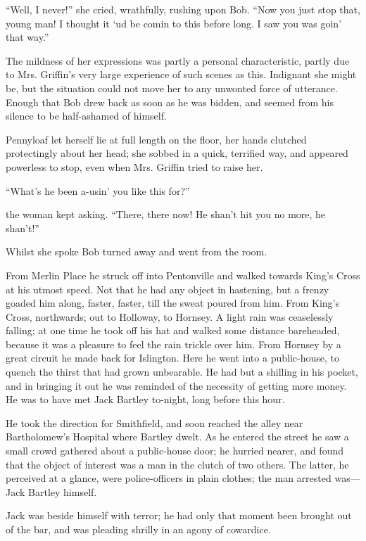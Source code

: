 ``Well, I never!'' she cried, wrathfully, rushing upon Bob. ``Now you
just stop that, young man! I thought it `ud be comin to this before
long. I saw you was goin' that way.''

The mildness of her expressions was partly a personal characteristic,
partly due to Mrs. Griffin's very large experience of such scenes as
this. Indignant she might be, but the situation could not move her to
any unwonted force of utterance. Enough that Bob drew back as soon as he
was bidden, and seemed from his silence to be half-ashamed of himself.

Pennyloaf let herself lie at full length on the floor, her hands
clutched protectingly about her head; she sobbed in a quick, terrified
way, and appeared powerless to stop, even when Mrs. Griffin tried to
raise her.

``What's he been a-usin' you like this for?''

{\protect\hypertarget{189}{}{}}the woman kept asking. ``There, there
now! He shan't hit you no more, he shan't!''

Whilst she spoke Bob turned away and went from the room.

From Merlin Place he struck off into Pentonville and walked towards
King's Cross at his utmost speed. Not that he had any object in
hastening, but a frenzy goaded him along, faster, faster, till the sweat
poured from him. From King's Cross, northwards; out to Holloway, to
Hornsey. A light rain was ceaselessly falling; at one time he took off
his hat and walked some distance bareheaded, because it was a pleasure
to feel the rain trickle over him. From Hornsey by a great circuit he
made back for Islington. Here he went into a public-house, to quench the
thirst that had grown unbearable. He had but a shilling in his pocket,
and in bringing it out he was reminded of the necessity of getting more
money. He was to have met Jack Bartley to-night, long before this hour.

He took the direction for Smithfield, and soon reached the alley near
Bartholomew's Hospital where Bartley dwelt. As he entered the street he
saw a small crowd gathered about {\protect\hypertarget{190}{}{}}a
public-house door; he hurried nearer, and found that the object of
interest was a man in the clutch of two others. The latter, he perceived
at a glance, were police-officers in plain clothes; the man arrested
was---Jack Bartley himself.

Jack was beside himself with terror; he had only that moment been
brought out of the bar, and was pleading shrilly in an agony of
cowardice.

